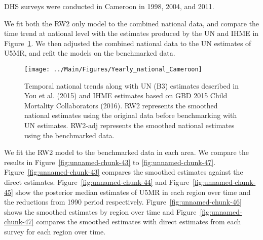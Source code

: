 \documentclass[12pt]{article}\usepackage[]{graphicx}\usepackage[]{color}
\newenvironment{knitrout}{}{} %
\begin{document}


DHS surveys were conducted in Cameroon in 1998, 2004, and 2011.

We fit both the RW2 only model to the combined national data, and compare the time trend at national level with the estimates produced by the UN and IHME in Figure~\ref{fig:unnamed-chunk-42}. We then adjusted the combined national data to the UN estimates of U5MR, and refit the models on the benchmarked data. 

\begin{knitrout}
\color{fgcolor}\begin{figure}[bht]

{\centering \texttt{[image: ../Main/Figures/Yearly\_national\_Cameroon]} 

}

\caption[Temporal national trends along with UN (B3) estimates described in You et al]{Temporal national trends along with UN (B3) estimates described in You et al. (2015) and IHME estimates based on GBD 2015 Child Mortality Collaborators (2016). RW2 represents the smoothed national estimates using the original data before benchmarking with UN estimates. RW2-adj represents the smoothed national estimates using the benchmarked data.}\label{fig:unnamed-chunk-42}
\end{figure}


\end{knitrout}
 

We fit the RW2 model to the benchmarked data in each area. 
We compare the results in Figure~\ref{fig:unnamed-chunk-43} to \ref{fig:unnamed-chunk-47}.
Figure~\ref{fig:unnamed-chunk-43} compares the smoothed estimates against the direct estimates. Figure~\ref{fig:unnamed-chunk-44} and Figure~\ref{fig:unnamed-chunk-45} show the posterior median estimates of U5MR in each region over time and the reductions from 1990 period respectively.
Figure~\ref{fig:unnamed-chunk-46} shows the smoothed estimates by region over time and Figure~\ref{fig:unnamed-chunk-47} compares the smoothed estimates with direct estimates from each survey for each region over time.


\end{document}
